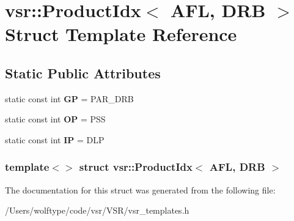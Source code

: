 \hypertarget{structvsr_1_1_product_idx_3_01_a_f_l_00_01_d_r_b_01_4}{\section{vsr\-:\-:Product\-Idx$<$ A\-F\-L, D\-R\-B $>$ Struct Template Reference}
\label{structvsr_1_1_product_idx_3_01_a_f_l_00_01_d_r_b_01_4}
}
\subsection*{Static Public Attributes}
\begin{DoxyCompactItemize}
\item 
\hypertarget{structvsr_1_1_product_idx_3_01_a_f_l_00_01_d_r_b_01_4_add4d1194994fa351adf07501107f546a}{static const int {\bfseries G\-P} = P\-A\-R\-\_\-\-D\-R\-B}\label{structvsr_1_1_product_idx_3_01_a_f_l_00_01_d_r_b_01_4_add4d1194994fa351adf07501107f546a}

\item 
\hypertarget{structvsr_1_1_product_idx_3_01_a_f_l_00_01_d_r_b_01_4_a9396b7a7cc74083ba6414033dc5aabcc}{static const int {\bfseries O\-P} = P\-S\-S}\label{structvsr_1_1_product_idx_3_01_a_f_l_00_01_d_r_b_01_4_a9396b7a7cc74083ba6414033dc5aabcc}

\item 
\hypertarget{structvsr_1_1_product_idx_3_01_a_f_l_00_01_d_r_b_01_4_ac130ec5461aafad1a8460729c143fa7b}{static const int {\bfseries I\-P} = D\-L\-P}\label{structvsr_1_1_product_idx_3_01_a_f_l_00_01_d_r_b_01_4_ac130ec5461aafad1a8460729c143fa7b}

\end{DoxyCompactItemize}
\subsubsection*{template$<$$>$ struct vsr\-::\-Product\-Idx$<$ A\-F\-L, D\-R\-B $>$}



The documentation for this struct was generated from the following file\-:\begin{DoxyCompactItemize}
\item 
/\-Users/wolftype/code/vsr/\-V\-S\-R/vsr\-\_\-templates.\-h\end{DoxyCompactItemize}
